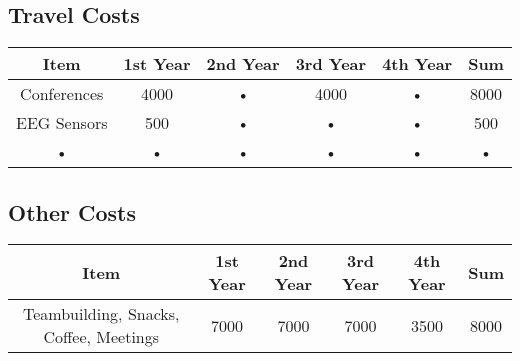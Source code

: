 \subsection{Travel Costs}
\begin{tabular}{|c|c|c|c|c|c|}
\hline 
Item & 1st Year & 2nd Year & 3rd Year & 4th Year & Sum \\ 
\hline 
Conferences & 4000 & • & 4000 & • & 8000 \\ 
\hline 
EEG Sensors & 500 & • & • & • & 500 \\ 
\hline 
• & • & • & • & • & • \\ 
\hline 
\end{tabular} 
\subsection{Other Costs}
\begin{tabular}{|c|c|c|c|c|c|}
\hline 
Item & 1st Year & 2nd Year & 3rd Year & 4th Year & Sum \\ 
\hline 
Teambuilding, Snacks, Coffee, Meetings & 7000 & 7000 & 7000 & 3500 & 8000 \\
\hline 
\end{tabular} 

